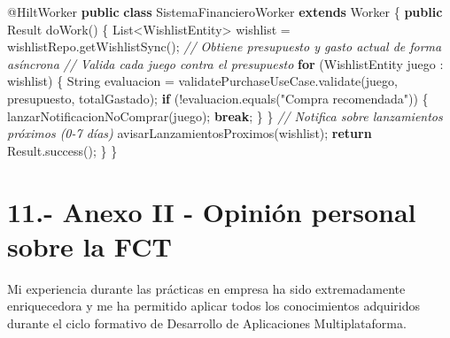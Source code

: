 \documentclass[
  spanish,
  11pt,
  paper=a4,
  ,captions=tableheading
]{scrartcl}
\newenvironment{Shaded}{}{}
\newcommand{\AttributeTok}[1]{\textcolor[rgb]{0.49,0.56,0.16}{#1}}
\newcommand{\BuiltInTok}[1]{\textcolor[rgb]{0.00,0.50,0.00}{#1}}
\newcommand{\CommentTok}[1]{\textcolor[rgb]{0.38,0.63,0.69}{\textit{#1}}}
\newcommand{\ControlFlowTok}[1]{\textcolor[rgb]{0.00,0.44,0.13}{\textbf{#1}}}
\newcommand{\FunctionTok}[1]{\textcolor[rgb]{0.02,0.16,0.49}{#1}}
\newcommand{\KeywordTok}[1]{\textcolor[rgb]{0.00,0.44,0.13}{\textbf{#1}}}
\newcommand{\NormalTok}[1]{#1}
\newcommand{\OperatorTok}[1]{\textcolor[rgb]{0.40,0.40,0.40}{#1}}
\newcommand{\StringTok}[1]{\textcolor[rgb]{0.25,0.44,0.63}{#1}}
\begin{document}
\begin{Shaded}
\begin{Highlighting}[]
\AttributeTok{@HiltWorker}
\KeywordTok{public} \KeywordTok{class}\NormalTok{ SistemaFinancieroWorker }\KeywordTok{extends}\NormalTok{ Worker }\OperatorTok{\{}
    \KeywordTok{public} \BuiltInTok{Result} \FunctionTok{doWork}\OperatorTok{()} \OperatorTok{\{}
        \BuiltInTok{List}\OperatorTok{\textless{}}\NormalTok{WishlistEntity}\OperatorTok{\textgreater{}}\NormalTok{ wishlist }\OperatorTok{=}\NormalTok{ wishlistRepo}\OperatorTok{.}\FunctionTok{getWishlistSync}\OperatorTok{();}
        \CommentTok{// Obtiene presupuesto y gasto actual de forma asíncrona}
        \CommentTok{// Valida cada juego contra el presupuesto}
        \ControlFlowTok{for} \OperatorTok{(}\NormalTok{WishlistEntity juego }\OperatorTok{:}\NormalTok{ wishlist}\OperatorTok{)} \OperatorTok{\{}
            \BuiltInTok{String}\NormalTok{ evaluacion }\OperatorTok{=}\NormalTok{ validatePurchaseUseCase}\OperatorTok{.}\FunctionTok{validate}\OperatorTok{(}\NormalTok{juego}\OperatorTok{,}\NormalTok{ presupuesto}\OperatorTok{,}\NormalTok{ totalGastado}\OperatorTok{);}
            \ControlFlowTok{if} \OperatorTok{(!}\NormalTok{evaluacion}\OperatorTok{.}\FunctionTok{equals}\OperatorTok{(}\StringTok{"Compra recomendada"}\OperatorTok{))} \OperatorTok{\{}
                \FunctionTok{lanzarNotificacionNoComprar}\OperatorTok{(}\NormalTok{juego}\OperatorTok{);}
                \ControlFlowTok{break}\OperatorTok{;}
            \OperatorTok{\}}
        \OperatorTok{\}}
        \CommentTok{// Notifica sobre lanzamientos próximos (0{-}7 días)}
        \FunctionTok{avisarLanzamientosProximos}\OperatorTok{(}\NormalTok{wishlist}\OperatorTok{);}
        \ControlFlowTok{return} \BuiltInTok{Result}\OperatorTok{.}\FunctionTok{success}\OperatorTok{();}
    \OperatorTok{\}}
\OperatorTok{\}}
\end{Highlighting}
\end{Shaded}

\newpage

\hypertarget{anexo-ii---opiniuxf3n-personal-sobre-la-fct}{%
\section{11.- Anexo II - Opinión personal sobre la
FCT}\label{anexo-ii---opiniuxf3n-personal-sobre-la-fct}}

Mi experiencia durante las prácticas en empresa ha sido extremadamente
enriquecedora y me ha permitido aplicar todos los conocimientos
adquiridos durante el ciclo formativo de Desarrollo de Aplicaciones
Multiplataforma.
\end{document}
